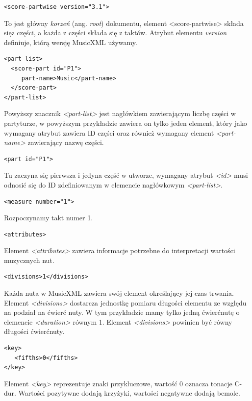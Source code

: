 \documentclass[printmode, eng, openany]{mgr}
\begin{document}
\begin{lstlisting}
<score-partwise version="3.1">
\end{lstlisting}
To jest główny \textit{korzeń} (ang. \textit{root}) dokumentu, element <score-partwise> składa się\linebreak z części, a każda z części składa się z taktów. Atrybut elementu \textit{version} definiuje, którą wersję MusicXML używamy.

\begin{lstlisting}
<part-list>
  <score-part id="P1">
     part-name>Music</part-name>
  </score-part>
</part-list>
\end{lstlisting}
Powyższy znacznik \textit{<part-list>} jest nagłówkiem zawierającym liczbę części w partyturze, w powyższym przykładzie zawiera on tylko jeden element, który jako wymagany atrybut zawiera ID części oraz również wymagany element \textit{<part-name>} zawierający nazwę części.


\begin{lstlisting}
<part id="P1">
\end{lstlisting}
Tu zaczyna się pierwsza i jedyna część w utworze, wymagany atrybut \textit{<id>} musi odnosić się do ID zdefiniowanym w elemencie nagłówkowym \textit{<part-list>}.

\begin{lstlisting}
<measure number="1">
\end{lstlisting}
Rozpoczynamy takt numer 1.

\begin{lstlisting}
<attributes>
\end{lstlisting}
Element \textit{<attributes>} zawiera informacje potrzebne do interpretacji wartości muzycznych nut.


\begin{lstlisting}
<divisions>1</divisions>
\end{lstlisting}
Każda nuta w MusicXML zawiera swój element określający jej czas trwania. Element \textit{<divisions>} dostarcza jednostkę pomiaru długości elementu  ze względu na podział na ćwierć nuty. W tym przykładzie mamy tylko jedną ćwierćnutę o elemencie \textit{<duration>} równym 1. Element \textit{<divisions>} powinien być równy długości ćwierćnuty.

\begin{lstlisting}
<key>
   <fifths>0</fifths>
</key>
\end{lstlisting}
Element \textit{<key>} reprezentuje znaki przykluczowe, wartość 0 oznacza tonacje C-dur. Wartości pozytywne dodają krzyżyki, wartości negatywne dodają bemole. 
\end{document}
